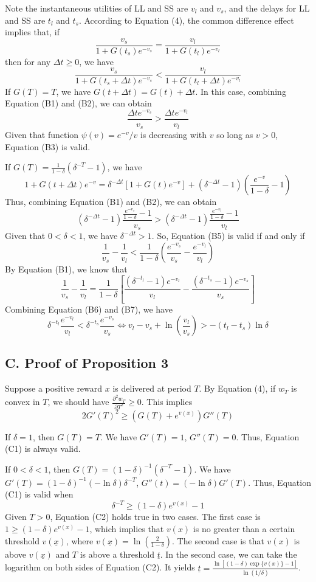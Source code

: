 \documentclass[
  12pt,
]{article}
\begin{document}
Note the instantaneous utilities of LL and SS are \(v_l\) and \(v_s\),
and the delays for LL and SS are \(t_l\) and \(t_s\). According to
Equation (4), the common difference effect implies that, if\[ \tag{B1}
\frac{v_s}{1+G(t_s)e^{-v_s}} = \frac{v_l}{1+G(t_l)e^{-v_l}}
\]then for any \(\Delta t \geq 0\), we have \[ \tag{B2}
\frac{v_s}{1+G(t_s+\Delta t)e^{-v_s}} < \frac{v_l}{1+G(t_l+\Delta t)e^{-v_l}}
\]If \(G(T)=T\), we have \(G(t+\Delta t) = G(t) + \Delta t\). In this
case, combining Equation (B1) and (B2), we can obtain\[ \tag{B3}
\frac{\Delta t e^{-v_s}}{v_s} > \frac{\Delta t e^{-v_l}}{v_l}
\]Given that function \(\psi(v) = e^{-v}/v\) is decreasing with \(v\) so
long as \(v>0\), Equation (B3) is valid.

If \(G(T) = \frac{1}{1-\delta}(\delta^{-T}-1)\), we have\[\tag{B4}
1+G(t+\Delta t)e^{-v} = \delta^{-\Delta t}[1+G(t)e^{-v}]+(\delta^{-\Delta t}-1)(\frac{e^{-v}}{1-\delta}-1)
\] Thus, combining Equation (B1) and (B2), we can obtain\[\tag{B5}
(\delta^{-\Delta t}-1)\frac{\frac{e^{-v_s}}{1-\delta}-1}{v_s} >
(\delta^{-\Delta t}-1)\frac{\frac{e^{-v_l}}{1-\delta}-1}{v_l}
\] Given that \(0<\delta<1\), we have \(\delta^{-\Delta t}>1\). So,
Equation (B5) is valid if and only if\[\tag{B6}
\frac{1}{v_s}-\frac{1}{v_l}<\frac{1}{1-\delta}(\frac{e^{-v_s}}{v_s}-\frac{e^{-v_l}}{v_l})
\] By Equation (B1), we know that\[\tag{B7}
\frac{1}{v_s}-\frac{1}{v_l}=\frac{1}{1-\delta}\left[\frac{(\delta^{-t_l}-1)e^{-v_l}}{v_l} -\frac{(\delta^{-t_s}-1)e^{-v_s}}{v_s}\right]
\] Combining Equation (B6) and (B7), we have\[
\delta^{-t_l}\frac{e^{-v_l}}{v_l}<\delta^{-t_s}\frac{e^{-v_s}}{v_s} \Longleftrightarrow v_l - v_s + \ln \left(\frac{v_l}{v_s}\right)>-(t_l-t_s)\ln\delta
\]

\hypertarget{c.-proof-of-proposition-3}{%
\subsection*{C. Proof of Proposition
3}\label{c.-proof-of-proposition-3}}

Suppose a positive reward \(x\) is delivered at period \(T\). By
Equation (4), if \(w_T\) is convex in \(T\), we should have
\(\frac{\partial^2 w_T}{\partial T^2}\geq 0\). This
implies\[\tag{C1} 2G'(T)^2\geq(G(T)+e^{v(x)})G''(T) \]

If \(\delta=1\), then \(G(T)=T\). We have \(G'(T)=1\), \(G''(T)=0\).
Thus, Equation (C1) is always valid.

If \(0<\delta<1\), then \(G(T)=(1-\delta)^{-1}(\delta^{-T}-1)\). We have
\(G'(T)=(1-\delta)^{-1}(-\ln\delta)\delta^{-T}\),
\(G''(t)=(-\ln\delta)G'(T)\). Thus, Equation (C1) is valid when
\[\tag{C2} \delta^{-T}\geq(1-\delta)e^{v(x)}-1 \]Given \(T>0\), Equation
(C2) holds true in two cases. The first case is
\(1\geq (1-\delta)e^{v(x)}-1\), which implies that \(v(x)\) is no
greater than a certain threshold \(v(\underline{x})\), where
\(v(\underline{x})=\ln(\frac{2}{1-\delta})\). The second case is that
\(v(x)\) is above \(v(\underline{x})\) and \(T\) is above a threshold
\(\underline{t}\). In the second case, we can take the logarithm on both
sides of Equation (C2). It yields
\(\underline{t}=\frac{\ln[(1-\delta)\exp\{v(x)\}-1]}{\ln(1/\delta)}\).
\end{document}
